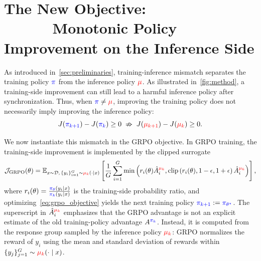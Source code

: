 
\section{The New Objective: \\
~~~~~~Monotonic Policy Improvement on the Inference Side}
\label{sec:methodology}



As introduced in~\autoref{sec:preliminaries}, training-inference mismatch separates the training policy $\textcolor{blue}{\pi}$ from the inference policy $\textcolor{red}{\mu}$. 
As illustrated in~\autoref{fig:method}, a training-side improvement can still lead to a harmful inference policy after synchronization.
Thus, when $\textcolor{blue}{\pi}\neq\textcolor{red}{\mu}$, improving the training policy does not necessarily imply improving the inference policy:
\begin{equation}
    J(\textcolor{blue}{\pi_{k+1}}) - J(\textcolor{blue}{\pi_k}) \geq 0
    \;\nRightarrow\;
    J(\textcolor{red}{\mu_{k+1}}) - J(\textcolor{red}{\mu_k}) \geq 0.
    \label{eq:mismatch_implication}
\end{equation}

We now instantiate this mismatch in the GRPO objective. 
In GRPO training, the training-side improvement is implemented by the clipped surrogate
\begin{equation}
\begin{aligned}
    \mathcal{J}_{\mathrm{GRPO}}(\theta)
    =
    \mathbb{E}_{x\sim\mathcal{D},\, \{y_i\}_{i=1}^{G} \sim \textcolor{red}{\mu_k}(\cdot\mid x)}
    \left[
        \frac{1}{G}
        \sum_{i=1}^{G}
        \min
        \left(
            r_i(\theta)\hat{A}^{\textcolor{red}{\mu_k}}_i,
            \operatorname{clip}
            \left(
                r_i(\theta),
                1-\epsilon,
                1+\epsilon
            \right)
            \hat{A}^{\textcolor{red}{\mu_k}}_i
        \right)
    \right],
    \label{eq:grpo_objective}
\end{aligned}
\end{equation}
where $r_i(\theta)=\frac{\textcolor{blue}{\pi_\theta}(y_i\mid x)}{\textcolor{blue}{\pi_k}(y_i\mid x)}$ is the training-side probability ratio, and optimizing~\autoref{eq:grpo_objective} yields the next training policy $\textcolor{blue}{\pi_{k+1}}:=\textcolor{blue}{\pi_{\theta^\star}}$. 
The superscript in $\hat{A}^{\textcolor{red}{\mu_k}}_i$ emphasizes that the GRPO advantage is not an explicit estimate of the old training-policy advantage $A^{\textcolor{blue}{\pi_k}}$. 
Instead, it is computed from the response group sampled by the inference policy $\textcolor{red}{\mu_k}$: GRPO normalizes the reward of $y_i$ using the mean and standard deviation of rewards within $\{y_j\}_{j=1}^G\sim\textcolor{red}{\mu_k}(\cdot\mid x)$.

